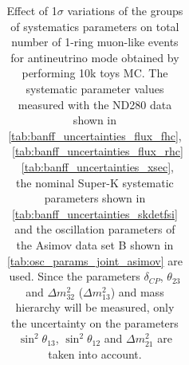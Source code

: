 \begin{table}[htb]
\begin{tabular}{| c | c | c |}
\end{tabular}
\caption{
 Effect of 1$\sigma$ variations of the groups of systematics parameters on total number of
 1-ring muon-like events for antineutrino mode obtained by performing 10k toys MC.
The systematic parameter values measured with the ND280 data 
shown in 
\cref{tab:banff_uncertainties_flux_fhc},
~\ref{tab:banff_uncertainties_flux_rhc}
~\ref{tab:banff_uncertainties_xsec},
the nominal Super-K systematic parameters shown in \cref{tab:banff_uncertainties_skdetfsi}
and the oscillation parameters of the Asimov data set B shown in \cref{tab:osc_params_joint_asimov}
are used.
Since the parameters $\delta_{CP}$, $\theta_{23}$ and $\Delta m^2_{32}$ ($\Delta m^2_{13}$) and mass hierarchy
will be measured,
only the uncertainty on the parameters 
$\sin^2 \theta_{13}$,
$\sin^2 \theta_{12}$
and 
$\Delta m^2_{21}$ 
are taken into account.
}                                                                                                                                                                                          
\label{tab:nsk_systematic_table_summary_joint_asimov_B_rhc_mulike_Run17c}
\end{table}




